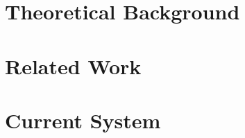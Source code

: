 
\chapter*{Theoretical Background}
\label{chap:theor}



\chapter*{Related Work}
\label{chap:relat}



\chapter*{Current System}
\label{chap:current}


